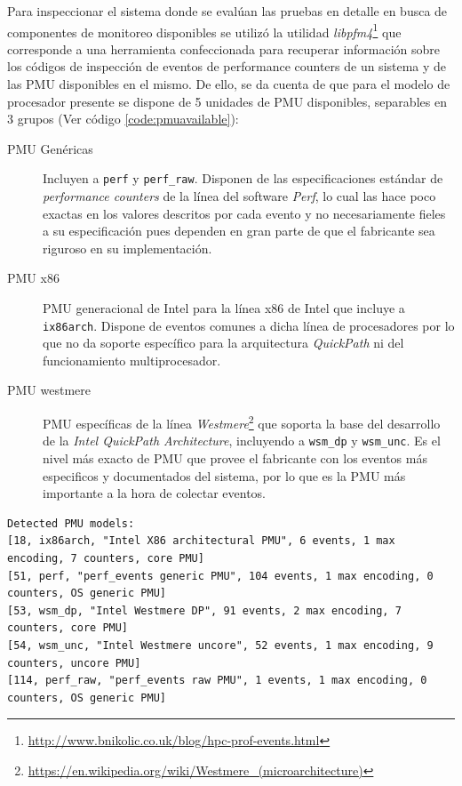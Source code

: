 Para inspeccionar el sistema donde se evalúan las pruebas en detalle en busca de componentes de monitoreo disponibles se utilizó la utilidad \emph{libpfm4}\footnote{\url{http://www.bnikolic.co.uk/blog/hpc-prof-events.html}} que corresponde a una herramienta confeccionada para recuperar información sobre los códigos de inspección de eventos de performance counters de un sistema y de las PMU disponibles en el mismo. De ello, se da cuenta de que para el modelo de procesador presente se dispone de 5 unidades de PMU disponibles, separables en 3 grupos (Ver código \ref{code:pmuavailable}):
\begin{description}
\item[PMU Genéricas] Incluyen a \verb=perf= y  \verb=perf_raw=. Disponen de las especificaciones estándar de \emph{performance counters} de la línea del software \emph{Perf}, lo cual las hace poco exactas en los valores descritos por cada evento y no necesariamente fieles a su especificación pues dependen en gran parte de que el fabricante sea riguroso en su implementación.
\item[PMU x86] PMU generacional de Intel para la línea x86 de Intel que incluye a \verb=ix86arch=. Dispone de eventos comunes a dicha línea de procesadores por lo que no da soporte específico para la arquitectura \emph{QuickPath} ni del funcionamiento multiprocesador.
\item[PMU westmere] PMU específicas de la línea \emph{Westmere}\footnote{\url{https://en.wikipedia.org/wiki/Westmere_(microarchitecture)}} que soporta la base del desarrollo de la \emph{Intel QuickPath Architecture}, incluyendo a \verb=wsm_dp= y \verb=wsm_unc=. Es el nivel más exacto de PMU que provee el fabricante con los eventos más especificos y documentados del sistema, por lo que es la PMU más importante a la hora de colectar eventos.
\end{description}

\vspace{1pc}
\begin{lstlisting}[style=BashInputStyle, label={code:pmuavailable}, caption={Listado de \emph{PMUs} disponibles en el sistema, recuperado con la herramienta \emph{libpfm4}.}, captionpos=b]
	Detected PMU models:
[18, ix86arch, "Intel X86 architectural PMU", 6 events, 1 max encoding, 7 counters, core PMU]
[51, perf, "perf_events generic PMU", 104 events, 1 max encoding, 0 counters, OS generic PMU]
[53, wsm_dp, "Intel Westmere DP", 91 events, 2 max encoding, 7 counters, core PMU]
[54, wsm_unc, "Intel Westmere uncore", 52 events, 1 max encoding, 9 counters, uncore PMU]
[114, perf_raw, "perf_events raw PMU", 1 events, 1 max encoding, 0 counters, OS generic PMU]
\end{lstlisting}

